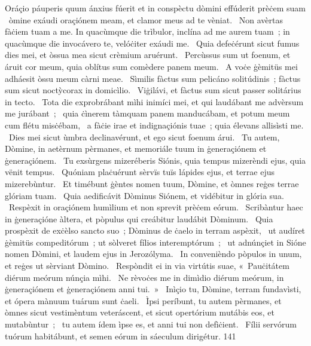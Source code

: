 { Oráçio páuperis quum ánxius fúerit et in conspèctu dòmini effúderit prèċem suam}
{%
~òmine exáudi oraçiónem meam, et clamor meus ad te vèniat. 
~Non avèrtas fàċiem tuam a me. In quacùmque die trìbulor, inclína ad me aurem tuam~; in quacùmque die invocávero te, velóċiter exáudi me. 
~Quia defeċérunt sicut fumus dies mei, et òssua mea sicut crèmium aruérunt. 
~Percùssus sum ut foenum, et áruit cor meum, quia oblítus sum comèdere panem meum. 
~A voċe ġèmitüs mei adháesit òssu meum càrni meae. 
~Sìmilis fàctus sum pelicáno solitúdinis~; fàctus sum sicut noctỳcorax in domicìlio. 
~Viġilávi, et fàctus sum sicut passer solitárius in tecto. 
~Tota die exprobrábant mìhi inimíci mei, et qui laudábant me advèrsum me jurábant~; 
~quia ċìnerem tàmquam panem manducábam, et potum meum cum flétu misċébam, 
~a fàċie irae et indignaçiónis tuae~; quia élevans allisìsti me. 
~Dies mei sicut ùmbra declinavérunt, et ego sicut foenum árui. 
~Tu autem, Dòmine, in aetèrnum pèrmanes, et memoriále tuum in ġeneraçiónem et ġeneraçiónem. 
~Tu exsùrgens mizeréberis Siónis, quia tempus mizerèndi ejus, quia vënit tempus. 
~Quóniam plaċuérunt sèrvïs tuïs lápides ejus, et terrae ejus mizerebùntur. 
~Et timébunt ġèntes nomen tuum, Dòmine, et òmnes reġes terrae glóriam tuam. 
~Quia aedificávit Dòminus Siónem, et vidébitur in glória sua. 
~Respèxit in oraçiónem humìlium et non sprevit prèċem eórum. 
~Scribàntur haec in ġeneraçióne àltera, et pòpulus qui creábitur laudábit Dòminum. 
~Quia prospèxit de exċèlso sancto suo~; Dòminus de ċaelo in terram aspèxit, 
~ut audíret ġèmitüs compeditórum~; ut sòlveret fílios interemptórum~; 
~ut adnúnçiet in Sióne nomen Dòmini, et laudem ejus in Jerozólyma. 
~In convenièndo pòpulos in unum, et reġes ut sèrviant Dòmino. 
~Respòndit ei in via virtútis suae, «~Pauċitátem diérum meórum núnçia mìhi.
~Ne rèvoċes me in dimìdio diérum meórum, in ġeneraçiónem et ġeneraçiónem anni tui.~»
~Inìçio tu, Dòmine, terram fundavìsti, et ópera mànuum tuárum sunt ċaeli. 
~Ìpsi períbunt, tu autem pèrmanes, et òmnes sicut vestimèntum veteráscent, et sicut opertórium mutábis eos, et mutabùntur~; 
~tu autem ídem ìpse es, et anni tui non defìċient. 
~Fílii servórum tuórum habitábunt, et semen eórum in sáeculum dirigétur. 
}
{14}{1}
